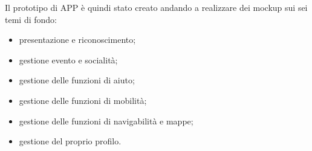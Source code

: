 \begin{figure}[htp]
\end{figure}

Il prototipo di APP è quindi stato creato andando a realizzare dei mockup sui sei temi di fondo:
\begin{itemize}
\item presentazione e riconoscimento;
\item gestione evento e socialità;
\item gestione delle funzioni di aiuto;
\item gestione delle funzioni di mobilità;
\item gestione delle funzioni di navigabilità e mappe;
\item gestione del proprio profilo.
\end{itemize}
